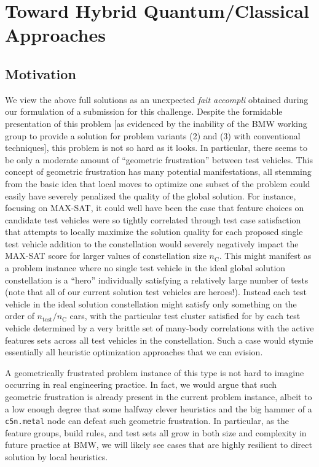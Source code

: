 \documentclass[aps,pra,twocolumn,superscriptaddress,groupedaddress]{revtex4}  %
\begin{document}
\section{Toward Hybrid Quantum/Classical Approaches}

\subsection{Motivation}

We view the above full solutions as an unexpected
\emph{fait accompli} obtained during our formulation of a submission for this
challenge. Despite the formidable presentation of
this problem [as evidenced by the inability of the BMW working group to provide
a solution for problem variants (2) and (3) with conventional techniques], this
problem is not so hard as it looks. In particular, there seems to be only a
moderate amount of ``geometric frustration'' between test vehicles. This concept
of geometric frustration has many potential manifestations, all stemming from
the basic idea that local moves to optimize one subset of the problem could
easily have severely penalized the quality of the global solution. For instance,
focusing on MAX-SAT, it could well have been the case that feature choices on
candidate test vehicles were so tightly correlated through test case
satisfaction that attempts to locally maximize the solution quality for each
proposed single test vehicle addition to the constellation would severely negatively
impact the MAX-SAT score for larger values of constellation size
$n_{\mathrm{C}}$. This might manifest as a problem instance where no single test
vehicle in the ideal global solution constellation is a ``hero'' individually
satisfying a relatively large number of tests (note that all of our current
solution test vehicles are heroes!). Instead each test vehicle in the ideal
solution constellation might satisfy only something on the order of
$n_{\mathrm{test}} / n_{\mathrm{C}}$ cars, with the particular test cluster
satisfied for by each test vehicle determined by a very brittle set of many-body
correlations with the active features sets across all test vehicles in the
constellation. Such a case would stymie essentially all heuristic optimization
approaches that we can evision.

A geometrically frustrated problem instance of this type is not hard to imagine
occurring in real engineering practice. In fact, we would argue that such
geometric frustration is already present in the current problem instance, albeit
to a low enough degree that some halfway clever heuristics and the big hammer of a
\texttt{c5n.metal} node can defeat such geometric frustration.  In particular,
as the feature groups, build rules, and test sets all grow in both size and
complexity in future practice at BMW, we will likely see cases that are highly
resilient to direct solution by local heuristics.
\end{document}
